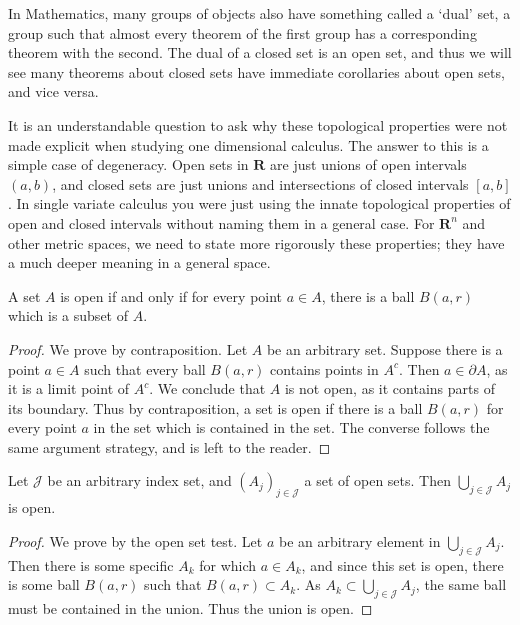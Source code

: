 In Mathematics, many groups of objects also have something called a `dual' set, a group such that almost every theorem of the first group has a corresponding theorem with the second. The dual of a closed set is an open set, and thus we will see many theorems about closed sets have immediate corollaries about open sets, and vice versa.

It is an understandable question to ask why these topological properties were not made explicit when studying one dimensional calculus. The answer to this is a simple case of degeneracy. Open sets in $\mathbf{R}$ are just unions of open intervals $(a,b)$, and closed sets are just unions and intersections of closed intervals $[a,b]$. In single variate calculus you were just using the innate topological properties of open and closed intervals without naming them in a general case. For $\mathbf{R}^n$ and other metric spaces, we need to state more rigorously these properties; they have a much deeper meaning in a general space.

\begin{lemma}
  A set $A$ is open if and only if for every point $a \in A$, there is a ball $B(a,r)$ which is a subset of $A$.
\end{lemma}
\begin{proof}
  We prove by contraposition. Let $A$ be an arbitrary set. Suppose there is a point $a \in A$ such that every ball $B(a,r)$ contains points in $A^c$. Then $a \in \partial A$, as it is a limit point of $A^c$. We conclude that $A$ is not open, as it contains parts of its boundary. Thus by contraposition, a set is open if there is a ball $B(a,r)$ for every point $a$ in the set which is contained in the set. The converse follows the same argument strategy, and is left to the reader.
\end{proof}

\begin{theorem}
  Let $\mathcal{J}$ be an arbitrary index set, and $(A_j)_{j \in \mathcal{J}}$ a set of open sets. Then $\bigcup_{j \in \mathcal{J}} A_j$ is open.
\end{theorem}
\begin{proof}
  We prove by the open set test. Let $a$ be an arbitrary element in $\bigcup_{j \in \mathcal{J}} A_j$. Then there is some specific $A_k$ for which $a \in A_k$, and since this set is open, there is some ball $B(a,r)$ such that $B(a,r) \subset A_k$. As $A_k \subset \bigcup_{j \in \mathcal{J}} A_j$, the same ball must be contained in the union. Thus the union is open.
\end{proof}

